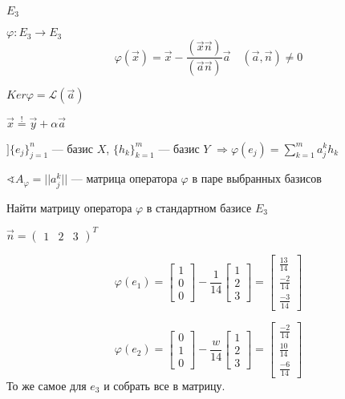 \begin{example}
    $E_3$

    $\varphi : E_3\to E_3$
    $$\varphi(\vec x) = \vec x - \frac{(\vec x \vec n)}{(\vec a \vec n)}\vec a \quad (\vec a, \vec n)\not=0$$

    $Ker \varphi=\mathcal{L}(\vec a)$

    $\vec x \stackrel{!}{=} \vec y + \alpha \vec a$
\end{example}

$] \{e_j\}_{j=1}^n$ --- базис $X$, $\{h_k\}_{k=1}^m$ --- базис $Y$ $\Rightarrow \varphi(e_j)=\sum\limits_{k=1}^m a_j^kh_k$

$\sphericalangle A_\varphi=||a_j^k||$ --- матрица оператора $\varphi$ в паре выбранных базисов

\begin{example}
    Найти матрицу оператора $\varphi$ в стандартном базисе $E_3$

    $\vec n = \begin{pmatrix}
        1 & 2 & 3
    \end{pmatrix}^T$

    $$\varphi(e_1)=\begin{bmatrix}
        1 \\ 0 \\ 0
    \end{bmatrix} - \frac{1}{14}\begin{bmatrix}
        1 \\
        2 \\
        3
    \end{bmatrix}=\begin{bmatrix}
        \frac{13}{14} \\
        \frac{-2}{14} \\
        \frac{-3}{14}
    \end{bmatrix}$$

    $$\varphi(e_2)=\begin{bmatrix}
        0 \\ 1 \\ 0
    \end{bmatrix} - \frac{w}{14}\begin{bmatrix}
        1 \\
        2 \\
        3
    \end{bmatrix}=\begin{bmatrix}
        \frac{-2}{14} \\
        \frac{10}{14} \\
        \frac{-6}{14}
    \end{bmatrix}$$
    То же самое для $e_3$ и собрать все в матрицу.
\end{example}

